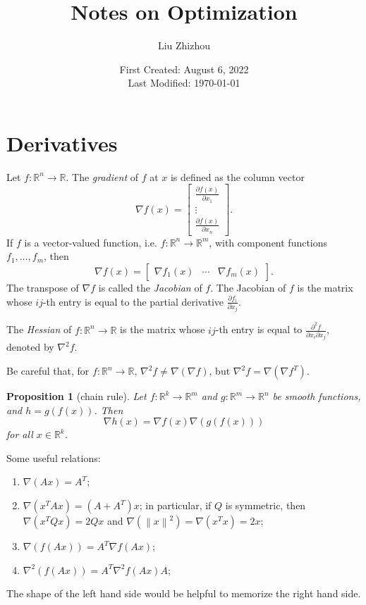 \documentclass[12pt,a4paper]{article}
\title{Notes on Optimization}
\author{Liu Zhizhou}
\date{First Created: August 6, 2022\\
	Last Modified: \today}
\numberwithin{equation}{section}
\theoremstyle{mystyle}
\newtheorem{proposition}[definition]{Proposition}
\newcommand{\R}{\mathbb{R}}
\newcommand{\grad}{\nabla}
\newcommand{\norm}[1]{\left\lVert #1 \right\rVert}
\begin{document}
	{\sffamily \maketitle}
	
	
	\tableofcontents
	
	\section{Derivatives}
	Let $f:\R^n \to \R$. The \emph{gradient} of $f$ at $x$ is defined as the column vector
	$$
	\grad f(x)=
	\begin{bmatrix}
		\frac{\partial f(x)}{\partial x_1}\\
		\vdots\\
		\frac{\partial f(x)}{\partial x_n}
	\end{bmatrix}.
	$$
	If $f$ is a vector-valued function, i.e. $f:\R^n\to \R^m$, with component functions $f_1,\dots,f_m$, then
	$$
	\grad f(x)=
	\begin{bmatrix}
		\grad f_1(x) & \cdots & \grad f_m(x)
	\end{bmatrix}.
	$$
	The transpose of $\grad f$ is called the \emph{Jacobian} of $f$. The Jacobian of $f$ is the matrix whose $ij$-th entry is equal to the partial derivative $\frac{\partial f_i}{\partial x_j}$.
	
	The \emph{Hessian} of $f:\R^n\to \R$ is the matrix whose $ij$-th entry is equal to $\frac{\partial^2 f}{\partial x_i \partial x_j}$, denoted by $\grad^2 f$.
	
	Be careful that, for $f:\R^n \to \R$, $\grad^2 f\neq \grad(\grad f)$, but $\grad^2 f = \grad(\grad f^T)$.
	\begin{proposition}[chain rule]
		Let $f:\R^k\to \R^m$ and $g:\R^m\to\R^n$ be smooth functions, and $h=g(f(x))$. Then
		$$
		\grad h(x) = \grad f(x)\grad(g(f(x)))
		$$
		for all $x\in \R^k$.
	\end{proposition}
	Some useful relations:
	\begin{enumerate}
		\item $\grad (Ax)=A^T$;
		\item $\grad (x^T A x)=(A+A^T)x$; in particular, if $Q$ is symmetric, then $\grad(x^T Q x)=2Qx$ and $\grad(\norm{x}^2)=\grad(x^T x)=2x$;
		\item $\grad(f(Ax))=A^T \grad f(Ax)$;
		\item $\grad^2(f(Ax))=A^T \grad^2 f(Ax)A$;
	\end{enumerate}
	The shape of the left hand side would be helpful to memorize the right hand side.
	
\end{document}
